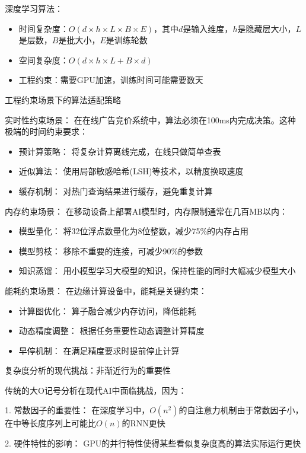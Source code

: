 深度学习算法：
\begin{itemize}
\item 时间复杂度：$O(d \times h \times L \times B \times E)$，其中$d$是输入维度，$h$是隐藏层大小，$L$是层数，$B$是批大小，$E$是训练轮数
\item 空间复杂度：$O(d \times h \times L + B \times d)$
\item 工程约束：需要GPU加速，训练时间可能需要数天
\end{itemize}

工程约束场景下的算法适配策略

实时性约束场景：
在在线广告竞价系统中，算法必须在100ms内完成决策。这种极端的时间约束要求：

\begin{itemize}
\item 预计算策略： 将复杂计算离线完成，在线只做简单查表
\item 近似算法： 使用局部敏感哈希(LSH)等技术，以精度换取速度
\item 缓存机制： 对热门查询结果进行缓存，避免重复计算
\end{itemize}

内存约束场景：
在移动设备上部署AI模型时，内存限制通常在几百MB以内：

\begin{itemize}
\item 模型量化： 将32位浮点数量化为8位整数，减少75\%的内存占用
\item 模型剪枝： 移除不重要的连接，可减少90\%的参数
\item 知识蒸馏： 用小模型学习大模型的知识，保持性能的同时大幅减少模型大小
\end{itemize}

能耗约束场景：
在边缘计算设备中，能耗是关键约束：

\begin{itemize}
\item 计算图优化： 算子融合减少内存访问，降低能耗
\item 动态精度调整： 根据任务重要性动态调整计算精度
\item 早停机制： 在满足精度要求时提前停止计算
\end{itemize}

复杂度分析的现代挑战：非渐近行为的重要性

传统的大O记号分析在现代AI中面临挑战，因为：

1. 常数因子的重要性： 在深度学习中，$O(n^2)$的自注意力机制由于常数因子小，在中等长度序列上可能比$O(n)$的RNN更快

2. 硬件特性的影响： GPU的并行特性使得某些看似复杂度高的算法实际运行更快

